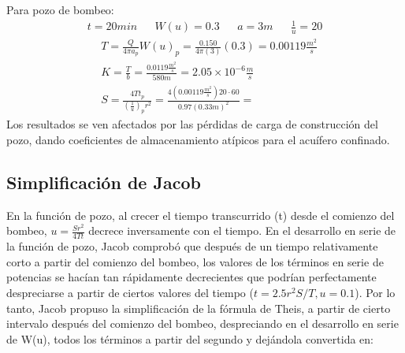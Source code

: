 Para pozo de bombeo:
\begin{align*}
    t = 20min&& W(u) = 0.3 && a = 3m && \frac{1}{u} = 20
\end{align*}
\begin{align*}
    &T = \frac{Q}{4\pi a_p } W(u)_p = \frac{0.150}{4 \pi (3)}(0.3) = 0.00119 \frac{m^2}{s}\\
    &K = \frac{T}{b} = \frac{0.0119 \frac{m^2}{s}}{580m}  = 2.05 \times 10^{ - 6} \frac{m}{s}\\
    &S = \frac{4Tt_p}{\left(\frac{1}{u}\right)_p r^2} = \frac{4\left(0.00119 \frac{m^2}{s}\right) 20 \cdot 60}{0.97 (0.33m)^2} = 
\end{align*}
Los resultados se ven afectados por las pérdidas de carga de construcción del pozo, dando coeficientes de almacenamiento atípicos para el acuífero confinado.
\subsection{Simplificación de Jacob}
En la función de pozo, al crecer el tiempo transcurrido (t) desde el comienzo del bombeo, $u=\frac{Sr^2}{4Tt}$  decrece inversamente con el tiempo. En el desarrollo en serie de la función de pozo, Jacob comprobó que después de un tiempo relativamente corto a partir del comienzo del bombeo, los valores de los términos en serie de potencias se hacían tan rápidamente decrecientes que podrían perfectamente despreciarse a partir de ciertos valores del tiempo ($ t= 2.5r^2S/T, u= 0.1$). Por lo tanto, Jacob propuso la simplificación de la fórmula de Theis, a partir de cierto intervalo después del comienzo del bombeo, despreciando en el desarrollo en serie de W(u), todos los términos a partir del segundo y dejándola convertida en:

